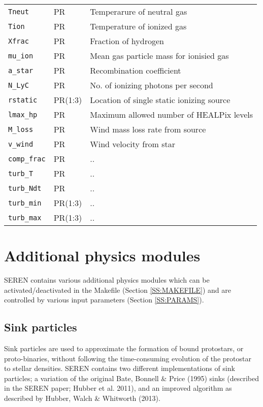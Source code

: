 \documentclass[a4paper]{article}
\newcommand{\var}[1]{\texttt{#1}}
\begin{document}
\begin{center}
\begin{supertabular}{|p{3cm}|p{2cm}|p{8cm}|}
\var{Tneut}          & PR       & Temperarure of neutral gas \\
\var{Tion}           & PR       & Temperature of ionized gas \\
\var{Xfrac}          & PR       & Fraction of hydrogen \\
\var{mu\_ion}        & PR       & Mean gas particle mass for ionisied gas \\
\var{a\_star}        & PR       & Recombination coefficient \\
\var{N\_LyC}         & PR       & No. of ionizing photons per second \\
\var{rstatic}        & PR(1:3)  & Location of single static ionizing source \\
\var{lmax\_hp}       & PR       & Maximum allowed number of HEALPix levels \\
\var{M\_loss}        & PR       & Wind mass loss rate from source \\
\var{v\_wind}        & PR       & Wind velocity from star \\ \hline
\var{comp\_frac}     & PR       & .. \\
\var{turb\_T}        & PR       & .. \\
\var{turb\_Ndt}      & PR       & .. \\
\var{turb\_min}      & PR(1:3)  & .. \\
\var{turb\_max}      & PR(1:3)  & .. \\ \hline
\end{supertabular}
\end{center}
\vspace{1cm}


\newpage


\section{Additional physics modules} \label{SS:PHYSICS}
SEREN contains various additional physics modules which can be activated/deactivated in the Makefile (Section \ref{SS:MAKEFILE}) and are controlled by various input parameters (Section \ref{SS:PARAMS}).


\subsection{Sink particles}
Sink particles are used to approximate the formation of bound protostars, or proto-binaries, without following the time-consuming evolution of the protostar to stellar densities.  SEREN contains two different implementations of sink particles; a variation of the original Bate, Bonnell \& Price (1995) sinks (described in the SEREN paper; Hubber et al. 2011), and an improved algorithm as described by Hubber, Walch \& Whitworth (2013).
\end{document}
